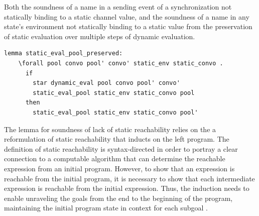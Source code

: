 \documentclass{article}
\begin{document}
Both the soundness of a name in a sending event of a synchronization not statically binding
to a static
channel value, and the soundness of a name in any state's environment not statically binding
to a static value from the preservation of static evaluation over multiple steps of dynamic
evaluation.

\begin{lstlisting}[language=logic, mathescape]
  lemma static_eval_pool_preserved:
    \forall pool convo pool' convo' static_env static_convo .
      if
        star dynamic_eval pool convo pool' convo' 
        static_eval_pool static_env static_convo pool
      then
        static_eval_pool static_env static_convo pool'
\end{lstlisting}

The lemma for soundness of lack of static reachability relies on the a reformulation of
static reachability that inducts on the left program.
The definition of static reachability is syntax-directed in
order to portray a clear connection to
a computable algorithm that can determine the reachable expression from an initial program.
However, to show that an expression is reachable from the initial program, it is necessary to
show that each intermediate expression is reachable from the initial expression.  Thus, the
induction needs to enable unraveling the goals from the end to the beginning of the program,
maintaining the initial program state in context for each subgoal .
\end{document}
